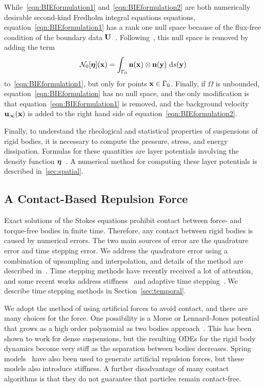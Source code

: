 \documentclass[AMA,STIX1COL]{WileyNJD-v2}
\begin{document}
While~\eqref{eqn:BIEformulation1} and~\eqref{eqn:BIEformulation2} are
both numerically desirable second-kind Fredholm integral equations
equations, equation~\eqref{eqn:BIEformulation1} has a rank one null
space because of the flux-free condition of the boundary data
${\mathbf{U}}$~\cite{Ladyzhenskaya1963}.  Following~\cite{Power1993}, this null
space is removed by adding the term 
\begin{align}
\label{eqn:N0_modification} 
  \mathcal{N}_0[{\boldsymbol\eta}]({\mathbf{x}}) = \int_{\Gamma_0} 
    {\mathbf{n}}({\mathbf{x}})\otimes{\mathbf{n}}({\mathbf{y}})~\text{d}s({\mathbf{y}})
\end{align}
to~\eqref{eqn:BIEformulation1}, but only for points ${\mathbf{x}} \in \Gamma_0$.
Finally, if $\Omega$ is unbounded, equation~\eqref{eqn:BIEformulation}
has no null space, and the only modification is that
equation~\eqref{eqn:BIEformulation1} is removed, and the background
velocity ${\mathbf{u}}_\infty({\mathbf{x}})$ is added to the right hand side of
equation~\eqref{eqn:BIEformulation2}.

Finally, to understand the rheological and statistical properties of
suspensions of rigid bodies, it is necessary to compute the pressure,
stress, and energy dissipation.  Formulas for these quantities are layer
potentials involving the density function ${\boldsymbol\eta}$~\cite{Power1993}.  A
numerical method for computing these layer potentials is described
in~\ref{sec:spatial}.


\subsection{A Contact-Based Repulsion Force}
\label{sec:repulsion}
Exact solutions of the Stokes equations prohibit contact between force-
and torque-free bodies in finite time.  Therefore, any contact between
rigid bodies is caused by numerical errors.  The two main sources of
error are the quadrature error and time stepping error.  We address the
quadrature error using a combination of upsampling and interpolation,
and details of the method are described in~\cite{Quaife2014}.  Time
stepping methods have recently received a lot of attention, and some
recent works address stiffness~\cite{Quaife2014} and adaptive time
stepping~\cite{Kropinski1999, Quaife2015, Sorgentone2018}.  We describe
time stepping methods in Section~\ref{sec:temporal}.

We adopt the method of using artificial forces to avoid contact, and
there are many choices for the force. One possibility is a Morse or
Lennard-Jones potential that grows as a high order polynomial as two
bodies approach~\cite{Flormann2017, Liu2006}. This has been shown to
work for dense suspensions, but the resulting ODEs for the rigid body
dynamics become very stiff as the separation between bodies decreases.
Spring models~\cite{Tsubota2006, Kabacogulu2017} have also
been used to generate artificial repulsion forces, but these models also
introduce stiffness. A further disadvantage of many contact algorithms
is that they do not guarantee that particles remain contact-free.
\end{document}
